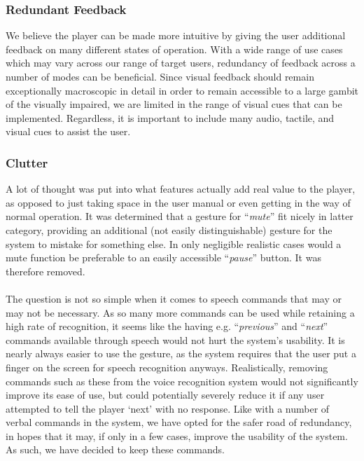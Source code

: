 \documentclass[10pt,letterpaper]{article}
\begin{document}
\subsubsection*{Redundant Feedback}
We believe the player can be made more intuitive by giving the user additional feedback on many different states of operation. With a wide range of use cases which may vary across our range of target users, redundancy of feedback across a number of modes can be beneficial. Since visual feedback should remain exceptionally macroscopic in detail in order to remain accessible to a large gambit of the visually impaired, we are limited in the range of visual cues that can be implemented. Regardless, it is important to include many audio, tactile, and visual cues to assist the user.

\subsubsection*{Clutter}
A lot of thought was put into what features actually add real value to the player, as opposed to just taking space in the user manual or even getting in the way of normal operation. It was determined that a gesture for ``\textit{mute}'' fit nicely in latter category, providing an additional (not easily distinguishable) gesture for the system to mistake for something else. In only negligible realistic cases would a mute function be preferable to an easily accessible ``\textit{pause}'' button. It was therefore removed.
\\ \\ 
The question is not so simple when it comes to speech commands that may or may not be necessary. As so many more commands can be used while retaining a high rate of recognition, it seems like the having e.g. ``\textit{previous}'' and ``\textit{next}'' commands available through speech would not hurt the system's usability. It is nearly always easier to use the gesture, as the system requires that the user put a finger on the screen for speech recognition anyways. Realistically, removing commands such as these from the voice recognition system would not significantly improve its ease of use, but could potentially severely reduce it if any user attempted to tell the player `next' with no response. Like with a number of verbal commands in the system, we have opted for the safer road of redundancy, in hopes that it may, if only in a few cases, improve the usability of the system. As such, we have decided to keep these commands.
\end{document}

